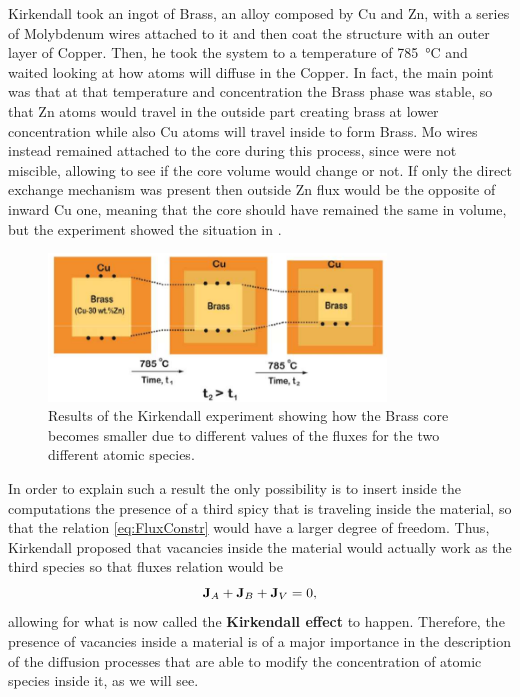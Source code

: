 Kirkendall took an ingot of Brass, an alloy composed by Cu and Zn, with a series of Molybdenum wires attached to it and then coat the structure with an outer layer of Copper. Then, he took the system to a temperature of \SI{785}{\celsius} and waited looking at how atoms will diffuse in the Copper. In fact, the main point was that at that temperature and concentration the Brass phase was stable, so that Zn atoms would travel in the outside part creating brass at lower concentration while also Cu atoms will travel inside to form Brass. Mo wires instead remained attached to the core during this process, since were not miscible, allowing to see if the core volume would change or not. If only the direct exchange mechanism was present then outside Zn flux would be the opposite of inward Cu one, meaning that the core should have remained the same in volume, but the experiment showed the situation in .
\begin{figure}[t]
    \centering
    \includegraphics[width=0.8\textwidth]{Immagini/KirkExper.png}
    \caption
    {
        Results of the Kirkendall experiment showing how the Brass core becomes smaller due to different values of the fluxes for the two different atomic species.
    }
    \label{fig:KirkExper}
\end{figure}
In order to explain such a result the only possibility is to insert inside the computations the presence of a third spicy that is traveling inside the material, so that the relation \eqref{eq:FluxConstr} would have a larger degree of freedom. Thus, Kirkendall proposed that vacancies inside the material would actually work as the third species so that fluxes relation would be
\begin{equation}
    \vb{J}_A  + \vb{J}_B + \vb{J}_V = 0,
\end{equation}
allowing for what is now called the \textbf{Kirkendall effect} to happen. Therefore, the presence of vacancies inside a material is of a major importance in the description of the diffusion processes that are able to modify the concentration of atomic species inside it, as we will see.

